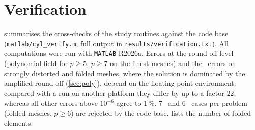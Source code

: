 \section{Verification}\label{sec:verification}
 summarises the cross-checks of the study routines against the
code base (\texttt{matlab/cyl\_verify.m}, full output in \texttt{results/verification.txt}).
All computations were run with \texttt{MATLAB} R2026a. Errors at the round-off level
(polynomial field for $p\ge5$, $p\ge7$ on the finest meshes) and the \PM\ errors on strongly
distorted and folded meshes, where the solution is dominated by the amplified round-off
(\cref{sec:poly}), depend on the floating-point environment: compared with a run on another
platform they differ by up to a factor $22$, whereas all other errors above $10^{-6}$ agree to
$1\,\%$. $7$ \PM\ and $6$ \PH\
cases per problem (folded meshes, $p\ge6$) are rejected by the code base. 
lists the number of folded elements.

